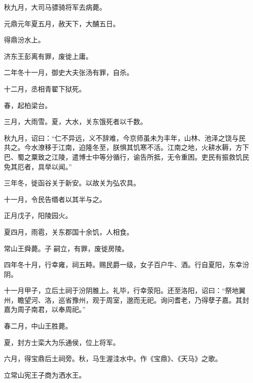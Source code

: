 \documentclass[12pt,UTF8]{ctexbook}
\begin{document}
秋九月，大司马骠骑将军去病薨。



元鼎元年夏五月，赦天下，大酺五日。



得鼎汾水上。



济东王彭离有罪，废徙上庸。



二年冬十一月，御史大夫张汤有罪，自杀。



十二月，丞相青翟下狱死。



春，起柏梁台。



三月，大雨雪。夏，大水，关东饿死者以千数。



秋九月，诏曰：“仁不异远，义不辞难，今京师虽未为丰年，山林、池泽之饶与民共之。今水潦移于江南，迫隆冬至，朕惧其饥寒不活。江南之地，火耕水耨，方下巴、蜀之粟致之江陵，遣博士中等分循行，谕告所抵，无令重困。吏民有振救饥民免其厄者，具举以闻。”



三年冬，徙函谷关于新安。以故关为弘农具。



十一月，令民告缗者以其半与之。



正月戊子，阳陵园火。



夏四月，雨雹，关东郡国十余饥，人相食。



常山王舜薨。子嗣立，有罪，废徙房陵。



四年冬十月，行幸雍，祠五畤。赐民爵一级，女子百户牛、酒。行自夏阳，东幸汾阴。



十一月甲子，立后土祠于汾阴脽上。礼毕，行幸荥阳。还至洛阳，诏曰：“祭地翼州，瞻望河、洛，巡省豫州，观于周室，邈而无祀。询问耆老，乃得孽子嘉。其封嘉为周子南君，以奉周祀。”



春二月，中山王胜薨。



夏，封方士栾大为乐通侯，位上将军。



六月，得宝鼎后土祠旁。秋，马生渥洼水中。作《宝鼎》、《天马》之歌。



立常山宪王子商为洒水王。
\end{document}
